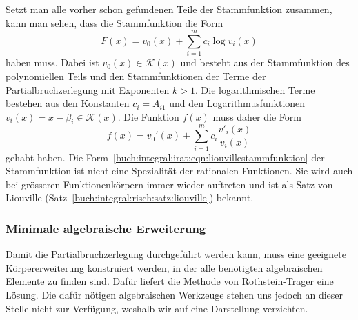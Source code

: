 Setzt man alle vorher schon gefundenen Teile der Stammfunktion zusammen,
kann man sehen, dass die Stammfunktion die Form
\begin{equation}
F(x) = v_0(x) + \sum_{i=1}^m c_i \log v_i(x)
\label{buch:integral:irat:eqn:liouvillestammfunktion}
\end{equation}
haben muss.
Dabei ist $v_0(x)\in\mathscr{K}(x)$ und besteht aus der Stammfunktion
des polynomiellen Teils und den Stammfunktionen der Terme der Partialbruchzerlegung mit Exponenten $k>1$.
Die logarithmischen Terme bestehen aus den Konstanten $c_i=A_{i1}$ 
und den Logarithmusfunktionen $v_i(x)=x-\beta_i\in\mathscr{K}(x)$.
Die Funktion $f(x)$ muss daher die Form
\begin{equation}
f(x)
=
v_0'(x)
+
\sum_{i=1}^m c_i\frac{v'_i(x)}{v_i(x)}
\label{buch:integral:irat:eqn:liouvillefunktion}
\end{equation}
gehabt haben.
Die Form~\eqref{buch:integral:irat:eqn:liouvillestammfunktion}
der Stammfunktion ist nicht eine Spezialität der rationalen Funktionen.
Sie wird auch bei grösseren Funktionenkörpern immer wieder auftreten
und ist als Satz von Liouville (Satz~\ref{buch:integral:risch:satz:liouville})
bekannt.

%
%
\subsubsection{Minimale algebraische Erweiterung}
Damit die Partialbruchzerlegung durchgeführt werden kann, muss
eine geeignete Körpererweiterung konstruiert werden, in der alle
benötigten algebraischen Elemente zu finden sind.
Dafür liefert die Methode von Rothstein-Trager eine Lösung.
Die dafür nötigen algebraischen Werkzeuge stehen uns jedoch
an dieser Stelle nicht zur Verfügung, weshalb wir auf eine
Darstellung verzichten.



